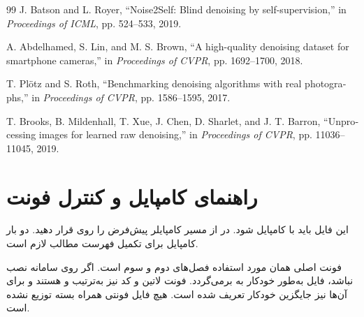 \documentclass[12pt,openany,oneside]{book}
\begin{document}
\begin{latin}
\begin{thebibliography}{99}
J. Batson and L. Royer,
``Noise2Self: Blind denoising by self-supervision,''
in \textit{Proceedings of ICML}, pp. 524--533, 2019.

A. Abdelhamed, S. Lin, and M. S. Brown,
``A high-quality denoising dataset for smartphone cameras,''
in \textit{Proceedings of CVPR}, pp. 1692--1700, 2018.

T. Plötz and S. Roth,
``Benchmarking denoising algorithms with real photographs,''
in \textit{Proceedings of CVPR}, pp. 1586--1595, 2017.

T. Brooks, B. Mildenhall, T. Xue, J. Chen, D. Sharlet, and J. T. Barron,
``Unprocessing images for learned raw denoising,''
in \textit{Proceedings of CVPR}, pp. 11036--11045, 2019.

\end{thebibliography}
\end{latin}

\chapter*{راهنمای کامپایل و کنترل فونت}

این فایل باید با  کامپایل شود. در  از مسیر
 کامپایلر پیش‌فرض را روی  قرار دهید.
دو بار کامپایل برای تکمیل فهرست مطالب لازم است.

فونت اصلی همان  مورد استفاده فصل‌های دوم و سوم است. اگر روی سامانه نصب نباشد، فایل به‌طور خودکار
به  برمی‌گردد. فونت لاتین و کد نیز به‌ترتیب  و
 هستند و برای آن‌ها نیز جایگزین خودکار تعریف شده است. هیچ فایل فونتی همراه بسته توزیع نشده است.
\end{document}
